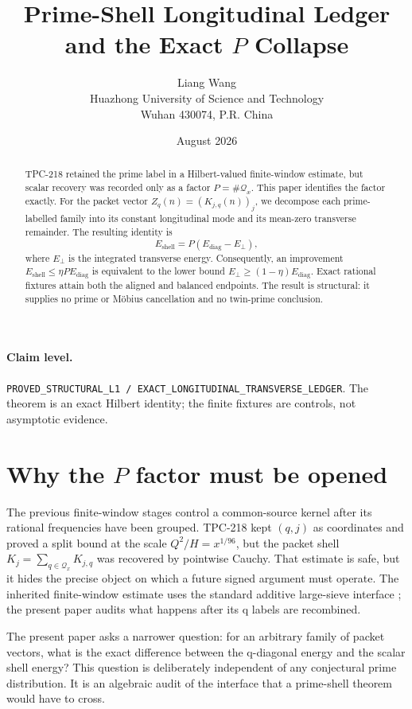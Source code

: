 \documentclass[11pt]{article}
\title{Prime-Shell Longitudinal Ledger and the Exact $P$ Collapse}
\author{Liang Wang\\Huazhong University of Science and Technology\\Wuhan 430074, P.R. China}
\date{August 2026}
\newcommand{\Qx}{\mathcal Q_x}
\newcommand{\Ediag}{E_{\mathrm{diag}}}
\newcommand{\Eperp}{E_{\perp}}
\newcommand{\Eshell}{E_{\mathrm{shell}}}
\begin{document}
\maketitle

\begin{abstract}
TPC-218 retained the prime label in a Hilbert-valued finite-window estimate, but scalar
recovery was recorded only as a factor $P=\#\mathcal Q_x$.  This paper identifies the
factor exactly.  For the packet vector $Z_q(n)=(K_{j,q}(n))_j$, we decompose each
prime-labelled family into its constant longitudinal mode and its mean-zero transverse
remainder.  The resulting identity is
\[
 \Eshell=P(\Ediag-\Eperp),
\]
where $\Eperp$ is the integrated transverse energy.  Consequently, an improvement
$\Eshell\leq\eta P\Ediag$ is equivalent to the lower bound
$\Eperp\geq(1-\eta)\Ediag$.  Exact rational fixtures attain both the aligned and
balanced endpoints.  The result is structural: it supplies no prime or Möbius
cancellation and no twin-prime conclusion.
\end{abstract}

\paragraph{Claim level.}
\texttt{PROVED\_STRUCTURAL\_L1 / EXACT\_LONGITUDINAL\_TRANSVERSE\_LEDGER}.
The theorem is an exact Hilbert identity; the finite fixtures are controls, not asymptotic
evidence.

\section{\texorpdfstring{Why the $P$ factor must be opened}{Why the P factor must be opened}}

The previous finite-window stages control a common-source kernel after its rational
frequencies have been grouped.  TPC-218 kept $(q,j)$ as coordinates and proved a split
bound at the scale $Q^2/H=x^{1/96}$, but the packet shell
$K_j=\sum_{q\in\Qx}K_{j,q}$ was recovered by pointwise Cauchy.  That estimate is safe,
but it hides the precise object on which a future signed argument must operate.  The
inherited finite-window estimate uses the standard additive large-sieve interface
\cite{montgomeryvaughan1973}; the present paper audits what happens after its q labels
are recombined.

The present paper asks a narrower question: for an arbitrary family of packet vectors,
what is the exact difference between the q-diagonal energy and the scalar shell energy?
This question is deliberately independent of any conjectural prime distribution.  It
is an algebraic audit of the interface that a prime-shell theorem would have to cross.
\end{document}
